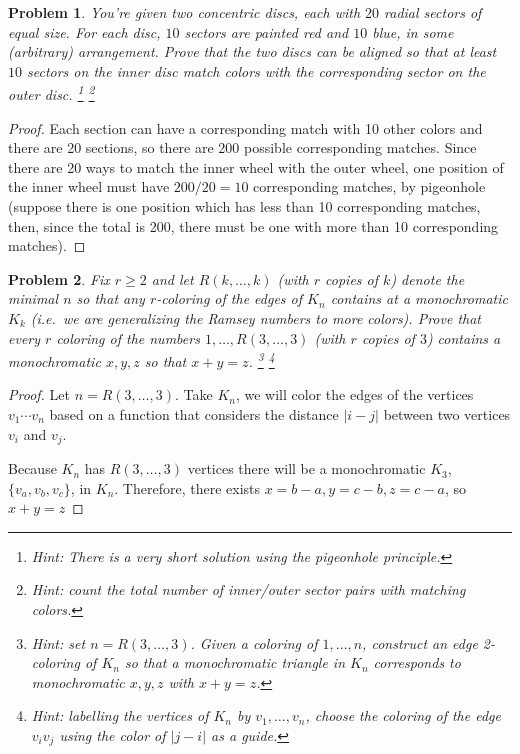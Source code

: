 \documentclass[11pt]{article}
\newtheorem{problem}{Problem}
\begin{document}
\pagebreak


\begin{problem}
You're given two concentric discs, each with $20$ radial sectors of equal size. For each disc, $10$ sectors are painted red and $10$ blue, in some (arbitrary) arrangement. Prove that the two discs can be aligned so that at least $10$ sectors on the inner disc match colors with the corresponding sector on the outer disc. \footnote{Hint: There is a very short solution using the pigeonhole principle.} \footnote{Hint: count the total number of inner/outer sector pairs with matching colors.}
\end{problem}

\begin{proof}
Each section can have a corresponding match with 10 other colors and there are 20 sections, so there are 200 possible corresponding matches. Since there are 20 ways to match the inner wheel with the outer wheel, one position of the inner wheel must have \(200 / 20 = 10\) corresponding matches, by pigeonhole (suppose there is one position which has less than 10 corresponding matches, then, since the total is 200, there must be one with more than 10 corresponding matches).
\end{proof}

\pagebreak

\begin{problem}
Fix $r\ge2$ and let $R(k,\ldots,k)$ (with $r$ copies of $k$) denote the minimal $n$ so that any $r$-coloring of the edges of $K_n$ contains at a monochromatic $K_k$ (i.e.\ we are generalizing the Ramsey numbers to more colors). Prove that every $r$ coloring of the numbers $1,\ldots,R(3,\ldots,3)$ (with $r$ copies of $3$) contains a monochromatic $x,y,z$ so that $x+y=z$. \footnote{Hint: set $n=R(3,\ldots,3)$. Given a coloring of $1,\ldots,n$, construct an edge 2-coloring of $K_n$ so that a monochromatic triangle in $K_n$ corresponds to monochromatic $x,y,z$ with $x+y=z$.} \footnote{Hint: labelling the vertices of $K_n$ by $v_1,\ldots,v_n$, choose the coloring of the edge $v_iv_j$ using the color of $|j-i|$ as a guide.}
\end{problem}

\begin{proof}
Let \(n = R(3,\ldots,3)\). Take \(K_n\), we will color the edges of the vertices \(v_1 \cdots v_n\) based on a function that considers the distance \(|i - j|\) between two vertices \(v_i\) and \(v_j\).

Because \(K_n\) has \(R(3,\ldots,3)\) vertices there will be a monochromatic \(K_3\), \(\{v_a, v_b, v_c\}\), in \(K_n\). Therefore, there exists \(x = b - a, y = c - b, z = c - a\), so \(x + y = z\)
\end{proof}
\end{document}
